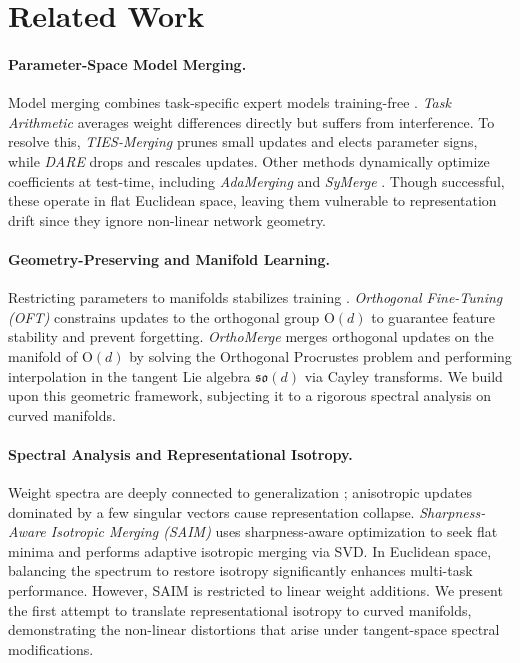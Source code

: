 \section{Related Work}
\label{sec:related_work}

\paragraph{Parameter-Space Model Merging.}
Model merging combines task-specific expert models training-free \cite{ilharco2022editing, wortsman23}. \emph{Task Arithmetic} \cite{ilharco2022editing} averages weight differences directly but suffers from interference. To resolve this, \emph{TIES-Merging} \cite{ties2023} prunes small updates and elects parameter signs, while \emph{DARE} \cite{dare2024} drops and rescales updates. Other methods dynamically optimize coefficients at test-time, including \emph{AdaMerging} \cite{adamerging2024} and \emph{SyMerge} \cite{symerge2026}. Though successful, these operate in flat Euclidean space, leaving them vulnerable to representation drift since they ignore non-linear network geometry.

\paragraph{Geometry-Preserving and Manifold Learning.}
Restricting parameters to manifolds stabilizes training \cite{harandi2016riemannian}. \emph{Orthogonal Fine-Tuning (OFT)} \cite{oft2023} constrains updates to the orthogonal group $\mathrm{O}(d)$ to guarantee feature stability and prevent forgetting. \emph{OrthoMerge} \cite{yang2026orthomerge} merges orthogonal updates on the manifold of $\mathrm{O}(d)$ by solving the Orthogonal Procrustes problem \cite{procrustes2004} and performing interpolation in the tangent Lie algebra $\mathfrak{so}(d)$ via Cayley transforms. We build upon this geometric framework, subjecting it to a rigorous spectral analysis on curved manifolds.

\paragraph{Spectral Analysis and Representational Isotropy.}
Weight spectra are deeply connected to generalization \cite{pennington2017geometry}; anisotropic updates dominated by a few singular vectors cause representation collapse. \emph{Sharpness-Aware Isotropic Merging (SAIM)} \cite{saim2026} uses sharpness-aware optimization to seek flat minima and performs adaptive isotropic merging via SVD. In Euclidean space, balancing the spectrum to restore isotropy significantly enhances multi-task performance. However, SAIM is restricted to linear weight additions. We present the first attempt to translate representational isotropy to curved manifolds, demonstrating the non-linear distortions that arise under tangent-space spectral modifications.
